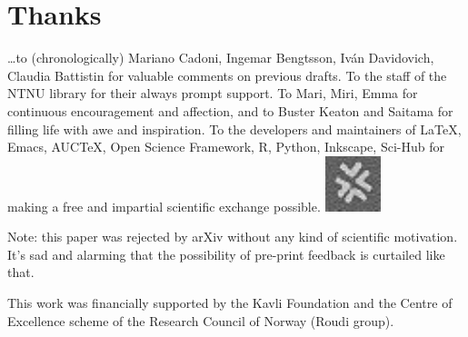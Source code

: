 \documentclass[\ifafour a4paper,12pt,\else a5paper,10pt,\fi%
onecolumn,oneside,article,%
british%
]{memoir}
\theoremstyle{remark}
\theoremstyle{innote}
\renewcommand*{\finalnamedelim}{\addspace\amp\space}
\newcommand*{\amp}{\&}
\newenvironment{acknowledgements}{\section*{Thanks}\addcontentsline{toc}{section}{Thanks}}{\par}
\newcommand*\autanet{\includegraphics[height=\heightof{M}]{autanet.pdf}}
\renewcommand*{\|}[1][]{\nonscript\,#1\vert\nonscript\;\mathopen{}}
\begin{document}



\begin{acknowledgements}
  \ldots to (chronologically) Mariano Cadoni, Ingemar Bengtsson, Iv\'an
  Davidovich, Claudia Battistin for valuable comments on previous drafts.
  To the staff of the NTNU library for their always prompt support. To
  Mari, Miri, Emma for continuous encouragement and affection, and to
  Buster Keaton and Saitama for filling life with awe and inspiration. To
  the developers and maintainers of \LaTeX, Emacs, AUC\TeX, Open Science
  Framework, R, Python, Inkscape, Sci-Hub for making a free and impartial
  scientific exchange possible. \mbox{}\hfill\autanet

  Note: this paper was rejected by arXiv without any kind of scientific
  motivation. It's sad and alarming that the possibility of pre-print
  feedback is curtailed like that.
  
  This work was financially supported by the Kavli Foundation and the
  Centre of Excellence scheme of the Research Council of Norway (Roudi
  group).
\end{acknowledgements}


\renewcommand*{\finalnamedelim}{\addcomma\space}

\printbibliography[prenote=prenote%
]
\end{document}
